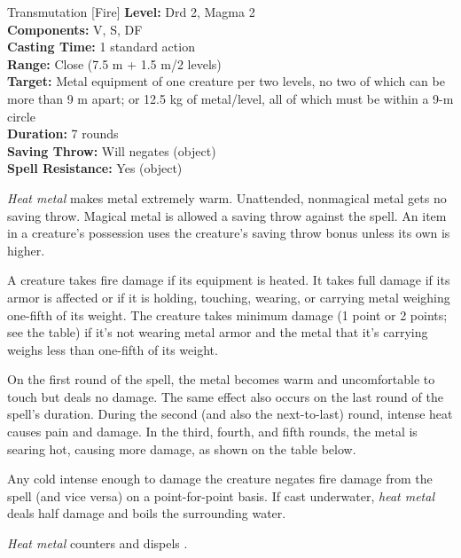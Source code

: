 {Transmutation [Fire]}
{
	\textbf{Level:}
	Drd 2, Magma 2\\
	\textbf{Components:}
	V, S, DF\\
	\textbf{Casting Time:}
	1 standard action\\
	\textbf{Range:}
	Close (7.5 m + 1.5 m/2 levels)\\
	\textbf{Target:}
	Metal equipment of one creature per two levels, no two of which can be more than 9 m apart; or 12.5 kg of metal/level, all of which must be within a 9-m circle\\
	\textbf{Duration:}
	7 rounds\\
	\textbf{Saving Throw:}
	Will negates (object)\\
	\textbf{Spell Resistance:}
	Yes (object)\\
}
{
	\emph{Heat metal} makes metal extremely warm. Unattended, nonmagical metal gets no saving throw. Magical metal is allowed a saving throw against the spell. An item in a creature's possession uses the creature's saving throw bonus unless its own is higher.

	A creature takes fire damage if its equipment is heated. It takes full damage if its armor is affected or if it is holding, touching, wearing, or carrying metal weighing one-fifth of its weight. The creature takes minimum damage (1 point or 2 points; see the table) if it's not wearing metal armor and the metal that it's carrying weighs less than one-fifth of its weight.


	On the first round of the spell, the metal becomes warm and uncomfortable to touch but deals no damage. The same effect also occurs on the last round of the spell's duration. During the second (and also the next-to-last) round, intense heat causes pain and damage. In the third, fourth, and fifth rounds, the metal is searing hot, causing more damage, as shown on the table below.

	Any cold intense enough to damage the creature negates fire damage from the spell (and vice versa) on a point-for-point basis. If cast underwater, \emph{heat metal} deals half damage and boils the surrounding water.

	\emph{Heat metal} counters and dispels .

}
